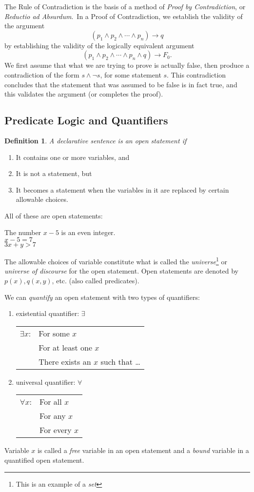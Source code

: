 \documentclass[12pt]{article}
\newtheorem{definition}{Definition} [section]
\begin{document}
\pagebreak
The Rule of Contradiction is the basis of a method of \emph{Proof by Contradiction}, or \emph{Reductio ad Absurdum}.\
In a Proof of Contradiction, we establish the validity of the argument
\[
(p_1 \wedge p_2 \wedge \cdots \wedge p_n) \rightarrow q
\]
by establishing the validity of the logically equivalent argument
\[
(p_1 \wedge p_2 \wedge \cdots \wedge p_n \wedge q) \rightarrow F_0.
\] 
We first assume that what we are trying to prove is actually false, then produce a contradiction of the form $s \wedge \neg s$, for some statement $s$. This contradiction concludes that the statement that was assumed to be false is in fact true, and this validates the argument (or completes the proof).
\subsection{Predicate Logic and Quantifiers}
\begin{definition} \emph{A declarative sentence is an }open statement \emph{if}\end{definition}
\begin{enumerate}
\item It contains one or more variables, and
\item It is not a statement, but
\item It becomes a statement when the variables in it are replaced by certain allowable choices.
\end{enumerate}
All of these are open statements: \begin{center}The number $x-5$ is an even integer.\\ $x-5=7$\\$3x+y>7$\end{center}
The allowable choices of variable constitute what is called the \emph{universe}\footnote{This is an example of a \emph{set}} or \emph{universe of discourse} for the open statement. Open statements are denoted by $p(x), q(x, y)$, etc. (also called predicates).

We can \emph{quantify} an open statement with two types of quantifiers:
\begin{enumerate}
\item existential quantifier: $\exists$\\
\begin{tabular} {ll}
$\exists x$: & For some $x$\\
& For at least one $x$\\
& There exists an $x$ such that \dots
\end{tabular}
\item universal quantifier: $\forall$\\
\begin{tabular} {ll}
$\forall x$: & For all $x$\\
& For any $x$\\
& For every $x$
\end{tabular}
\end{enumerate}
Variable $x$ is called a \emph{free} variable in an open statement and a \emph{bound} variable in a quantified open statement.
\end{document}
